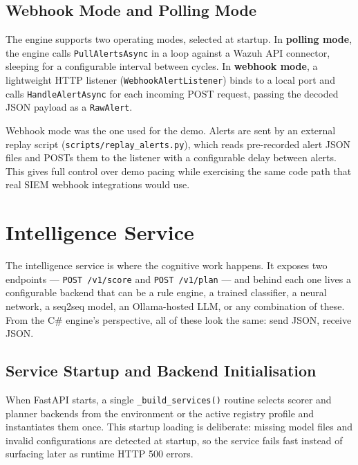 \subsection{Webhook Mode and Polling Mode}

The engine supports two operating modes, selected at startup. In \textbf{polling mode}, the engine calls \texttt{PullAlertsAsync} in a loop against a Wazuh API connector, sleeping for a configurable interval between cycles. In \textbf{webhook mode}, a lightweight HTTP listener (\texttt{WebhookAlertListener}) binds to a local port and calls \texttt{HandleAlertAsync} for each incoming POST request, passing the decoded JSON payload as a \texttt{RawAlert}.

Webhook mode was the one used for the demo. Alerts are sent by an external replay script (\texttt{scripts/replay\_alerts.py}), which reads pre-recorded alert JSON files and POSTs them to the listener with a configurable delay between alerts. This gives full control over demo pacing while exercising the same code path that real SIEM webhook integrations would use.

\section{Intelligence Service}
\label{sec:impl-intelligence}

The intelligence service is where the cognitive work happens. It exposes two endpoints --- \texttt{POST /v1/score} and \texttt{POST /v1/plan} --- and behind each one lives a configurable backend that can be a rule engine, a trained classifier, a neural network, a seq2seq model, an Ollama-hosted LLM, or any combination of these. From the C\# engine's perspective, all of these look the same: send JSON, receive JSON.

\subsection{Service Startup and Backend Initialisation}

When FastAPI starts, a single \texttt{\_build\_services()} routine selects scorer and planner backends from the environment or the active registry profile and instantiates them once. This startup loading is deliberate: missing model files and invalid configurations are detected at startup, so the service fails fast instead of surfacing later as runtime HTTP 500 errors.

